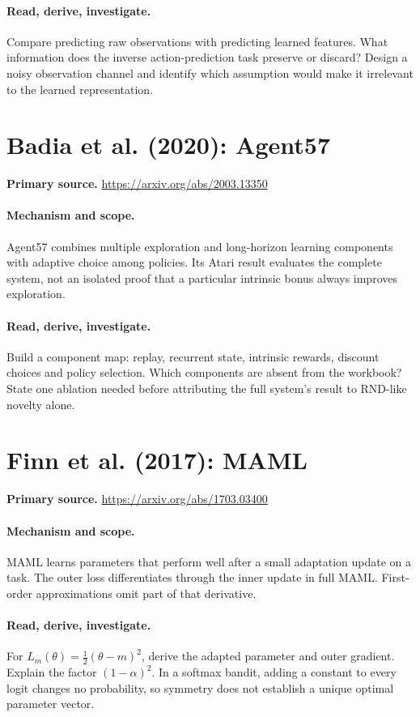 \documentclass[11pt]{scrartcl}
\begin{document}
\paragraph{Read, derive, investigate.} Compare predicting raw observations with predicting learned features. What information does the inverse action-prediction task preserve or discard? Design a noisy observation channel and identify which assumption would make it irrelevant to the learned representation.

\section{Badia et al. (2020): Agent57}
\noindent\textbf{Primary source.} \url{https://arxiv.org/abs/2003.13350}

\paragraph{Mechanism and scope.} Agent57 combines multiple exploration and long-horizon learning components with adaptive choice among policies. Its Atari result evaluates the complete system, not an isolated proof that a particular intrinsic bonus always improves exploration.

\paragraph{Read, derive, investigate.} Build a component map: replay, recurrent state, intrinsic rewards, discount choices and policy selection. Which components are absent from the workbook? State one ablation needed before attributing the full system's result to RND-like novelty alone.

\section{Finn et al. (2017): MAML}
\noindent\textbf{Primary source.} \url{https://arxiv.org/abs/1703.03400}

\paragraph{Mechanism and scope.} MAML learns parameters that perform well after a small adaptation update on a task. The outer loss differentiates through the inner update in full MAML. First-order approximations omit part of that derivative.

\paragraph{Read, derive, investigate.} For $L_m(\theta)=\tfrac12(\theta-m)^2$, derive the adapted parameter and outer gradient. Explain the factor $(1-\alpha)^2$. In a softmax bandit, adding a constant to every logit changes no probability, so symmetry does not establish a unique optimal parameter vector.
\end{document}
